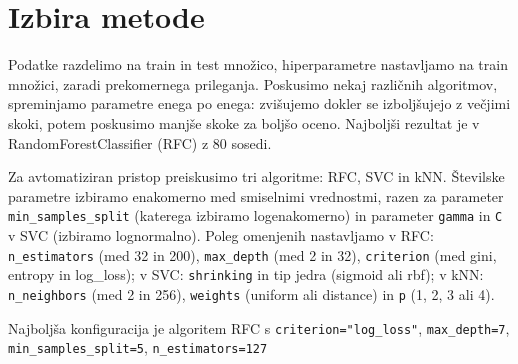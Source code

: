 \documentclass{article}
\begin{document}
\section{Izbira metode}
Podatke razdelimo na train in test množico, hiperparametre nastavljamo na train množici, zaradi prekomernega prileganja. Poskusimo nekaj različnih algoritmov, spreminjamo parametre enega po enega: zvišujemo dokler se izboljšujejo z večjimi skoki, potem poskusimo manjše skoke za boljšo oceno. Najboljši rezultat je v RandomForestClassifier (RFC) z 80 sosedi.

Za avtomatiziran pristop preiskusimo tri algoritme: RFC, SVC in kNN. Številske parametre izbiramo enakomerno med smiselnimi vrednostmi, razen za parameter \verb|min_samples_split| (katerega izbiramo logenakomerno) in parameter \verb|gamma| in \verb|C| v SVC (izbiramo lognormalno). Poleg omenjenih nastavljamo v RFC: \verb|n_estimators| (med 32 in 200), \verb|max_depth| (med 2 in 32), \verb|criterion| (med gini, entropy in log\_loss); v SVC: \verb|shrinking| in tip jedra (sigmoid ali rbf); v kNN: \verb|n_neighbors| (med 2 in 256), \verb|weights| (uniform ali distance) in \verb|p| (1, 2, 3 ali 4).

Najboljša konfiguracija je algoritem RFC s \verb|criterion="log_loss"|, \verb|max_depth=7|, \verb|min_samples_split=5|, \verb|n_estimators=127|
\end{document}

